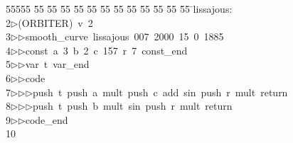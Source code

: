%
%
\begin{tabbing}
55555 \= 55 \= 55 \= 55 \= 55 \= 55 \= 55 \= 55 \= 55 \= 55 \= 55 \= 55 \= 55 \= \>lissajous:\\[0pt]
2\>$\triangleright$\>(ORBITER)\ v\ 2\ \\[0pt]
3\>$\triangleright$\>$\triangleright$\>smooth\_curve\ lissajous\ 007\ 2000\ 15\ 0\ 1885\ \\[0pt]
4\>$\triangleright$\>$\triangleright$\>const\ a\ 3\ b\ 2\ c\ 157\ r\ 7\ const\_end\ \\[0pt]
5\>$\triangleright$\>$\triangleright$\>var\ t\ var\_end\ \\[0pt]
6\>$\triangleright$\>$\triangleright$\>code\ \\[0pt]
7\>$\triangleright$\>$\triangleright$\>$\triangleright$\>push\ t\ push\ a\ mult\ push\ c\ add\ sin\ push\ r\ mult\ return\ \\[0pt]
8\>$\triangleright$\>$\triangleright$\>$\triangleright$\>push\ t\ push\ b\ mult\ sin\ push\ r\ mult\ return\ \\[0pt]
9\>$\triangleright$\>$\triangleright$\>code\_end\ \\[0pt]
10\>\end{tabbing}
